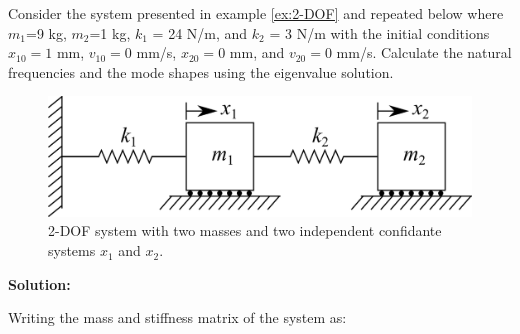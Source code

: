 \documentclass[12pt,letter]{article}
\begin{document}
	
	\begin{example}
	Consider the system presented in example \ref{ex:2-DOF} and repeated below where $m_1$=9 kg, $m_2$=1 kg, $k_1$ = 24 N/m, and $k_2$ = 3 N/m with the initial conditions $x_{10}=1$ mm, $v_{10}=0$ mm/s, $x_{20}=0$ mm, and $v_{20}=0$ mm/s. Calculate the natural frequencies and the mode shapes using the eigenvalue solution. 
	\begin{figure}[H]
		\centering
		\includegraphics[]{../figures/2-DOF-spring_mass_horizontal.png}
		\caption{2-DOF system with two masses and two independent confidante systems $x_1$ and $x_2$.}
	\end{figure}
	
	
	
	
\noindent \textbf{Solution:}  

Writing the mass and stiffness matrix of the system as:
	

\end{example}
\end{document}
